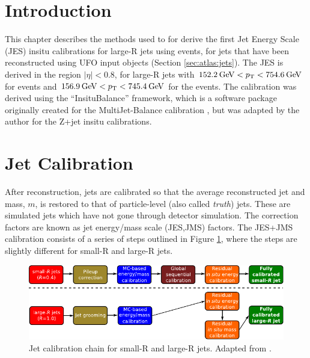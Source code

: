 \section{Introduction}
This chapter describes the methods used to for derive the first Jet Energy Scale (JES) insitu calibrations for large-R jets using \zjets events, for jets that have been reconstructed using UFO input objects (Section \ref{sec:atlas:jets}). The JES is derived in the region $|\eta|<0.8$, for large-R jets with $152.2\hspace{2pt}\text{Ge\kern -0.1em V} < p_{\text{T}} < 754.6\hspace{2pt}\text{Ge\kern -0.1em V}$ for \zee events and $156.9\hspace{2pt}\text{Ge\kern -0.1em V}<p_{\text{T}}<745.4\hspace{2pt}\text{Ge\kern -0.1em V}$ for the \zmm events. The calibration was derived using the ``InsituBalance'' framework, which is a software package originally created for the MultiJet-Balance calibration \cite{Atlas:largercali}, but was adapted by the author for the Z+jet insitu calibrations.%

\section{Jet Calibration\label{sec:jetcal}}

After reconstruction, jets are calibrated so that the average reconstructed jet \pt and mass, $m$, is restored to that of particle-level (also called \textit{truth}) jets. These are simulated jets which have not gone through detector simulation. The correction factors are known as jet energy/mass scale (JES,JMS) factors. The JES+JMS calibration consists of a series of steps outlined in Figure \ref{fig:jetcali}, where the steps are slightly different for small-R and large-R jets.

\begin{figure}[t]
    \centering
    \includegraphics[width=\textwidth]{plots/atlas/calichain.pdf}
    \caption{Jet calibration chain for small-R and large-R jets. Adapted from \cite{Schramm:2017frb}.\label{fig:jetcali}}
\end{figure}

